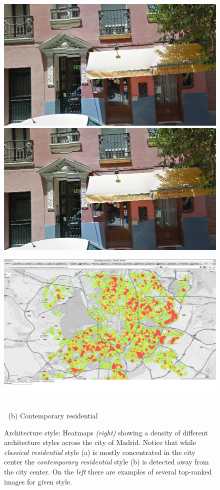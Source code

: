 \documentclass[runningheads]{llncs}
\begin{document}
\begin{figure}
\begin{minipage}{\linewidth}
\begin{minipage}{0.3\linewidth}
      \\ \vspace{-3mm} \\
      \includegraphics[width=0.49\linewidth]{imgs/cutout_pitch04.jpg}
      \includegraphics[width=0.49\linewidth]{imgs/cutout_pitch04.jpg}
    \end{minipage}
    \begin{minipage}{0.7\linewidth}
      \includegraphics[trim= 350 150 250 150, clip=true, width=\linewidth]{imgs/arch/mapS3.jpg}
    \end{minipage}
  \end{minipage}
  \\
  $\;$\hspace{30mm} (b) Contemporary residential
  \\
  \caption{
    Architecture style: Heatmaps \emph{(right)} showing a density of different architecture styles across the city of Madrid. Notice that while \emph{classical residential} style (a) is mostly concentrated in the city center the \emph{contemporary residential} style (b) is detected away from the city center. On the \emph{left} there are examples of several top-ranked images for given style.
  }
\end{figure}
\end{document}
